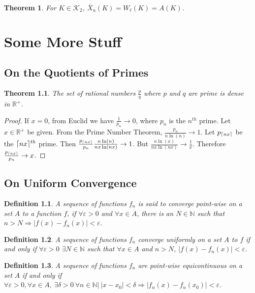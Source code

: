 \documentclass[12pt,oneside]{book}
\theoremstyle{mystyle}
\newtheorem{theorem}{Theorem}[section]
\newtheorem{definition}{Definition}[section]
\DeclarePairedDelimiter\ceil{\lceil}{\rceil}
\begin{document}
\begin{theorem}
For $K\in \mathscr{K}_2$, $\bar{X}_{u}(K) = W_{\ell}(K)=A(K)$.
\end{theorem}
%
\chapter{Some More Stuff}
%
\section{On the Quotients of Primes}
\begin{theorem}
The set of rational numbers $\frac{p}{q}$ where $p$ and $q$ are prime is dense in $\mathbb{R}^{+}$.
\end{theorem}
\begin{proof}
If $x=0$, from Euclid we have $\frac{1}{p_n}\rightarrow 0$, where $p_n$ is the $n^{th}$ prime. Let $x\in\mathbb{R}^{+}$ be given. From the Prime Number Theorem, $\frac{p_n}{n\ln(n)}\rightarrow 1$. Let $p_{\ceil{nx}}$ be the $\ceil{nx}^{th}$ prime. Then $\frac{p_{\ceil{nx}}}{p_n}\frac{n\ln(n)}{nx\ln(nx)}\rightarrow 1$. But $\frac{n\ln(x)}{nx\ln(nx)}\rightarrow \frac{1}{x}$. Therefore $\frac{p_{\ceil{nx}}}{p_n}\rightarrow x$.
\end{proof}
%
\section{On Uniform Convergence}
%
\begin{definition}
A sequence of functions $f_n$ is said to converge point-wise on a set $A$ to a function $f$, if $\forall\varepsilon>0$ and $\forall x\in A$, there is an $N\in\mathbb{N}$ such that $n>N \Rightarrow |f(x)-f_n(x)|<\varepsilon$.
\end{definition}

\begin{definition}
A sequence of functions $f_n$ converge uniformly on a set $A$ to $f$ if and only if $\forall \varepsilon>0$ $\exists N\in\mathbb{N}$ such that $\forall x \in A$ and $n>N$, $|f(x) -f_n(x)|<\varepsilon$.
\end{definition}

\begin{definition}
A sequence of functions $f_n$ are point-wise equicontinuous on a set $A$ if and only if $\forall \varepsilon>0, \forall x \in A,\ \exists \delta>0\ \forall n\in\mathbb{N}|\ |x-x_0|<\delta \Rightarrow |f_n(x) - f_n(x_0)|<\varepsilon$.
\end{definition}
\end{document}
